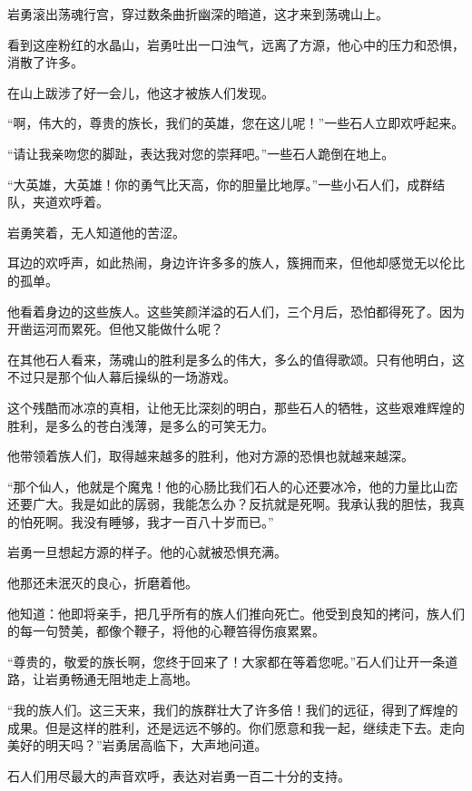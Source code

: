 
\begin{this_body}

岩勇滚出荡魂行宫，穿过数条曲折幽深的暗道，这才来到荡魂山上。

看到这座粉红的水晶山，岩勇吐出一口浊气，远离了方源，他心中的压力和恐惧，消散了许多。

在山上跋涉了好一会儿，他这才被族人们发现。

“啊，伟大的，尊贵的族长，我们的英雄，您在这儿呢！”一些石人立即欢呼起来。

“请让我亲吻您的脚趾，表达我对您的崇拜吧。”一些石人跪倒在地上。

“大英雄，大英雄！你的勇气比天高，你的胆量比地厚。”一些小石人们，成群结队，夹道欢呼着。

岩勇笑着，无人知道他的苦涩。

耳边的欢呼声，如此热闹，身边许许多多的族人，簇拥而来，但他却感觉无以伦比的孤单。

他看着身边的这些族人。这些笑颜洋溢的石人们，三个月后，恐怕都得死了。因为开凿运河而累死。但他又能做什么呢？

在其他石人看来，荡魂山的胜利是多么的伟大，多么的值得歌颂。只有他明白，这不过只是那个仙人幕后操纵的一场游戏。

这个残酷而冰凉的真相，让他无比深刻的明白，那些石人的牺牲，这些艰难辉煌的胜利，是多么的苍白浅薄，是多么的可笑无力。

他带领着族人们，取得越来越多的胜利，他对方源的恐惧也就越来越深。

“那个仙人，他就是个魔鬼！他的心肠比我们石人的心还要冰冷，他的力量比山峦还要广大。我是如此的孱弱，我能怎么办？反抗就是死啊。我承认我的胆怯，我真的怕死啊。我没有睡够，我才一百八十岁而已。”

岩勇一旦想起方源的样子。他的心就被恐惧充满。

他那还未泯灭的良心，折磨着他。

他知道：他即将亲手，把几乎所有的族人们推向死亡。他受到良知的拷问，族人们的每一句赞美，都像个鞭子，将他的心鞭笞得伤痕累累。

“尊贵的，敬爱的族长啊，您终于回来了！大家都在等着您呢。”石人们让开一条道路，让岩勇畅通无阻地走上高地。

“我的族人们。这三天来，我们的族群壮大了许多倍！我们的远征，得到了辉煌的成果。但是这样的胜利，还是远远不够的。你们愿意和我一起，继续走下去。走向美好的明天吗？”岩勇居高临下，大声地问道。

石人们用尽最大的声音欢呼，表达对岩勇一百二十分的支持。


\end{this_body}
